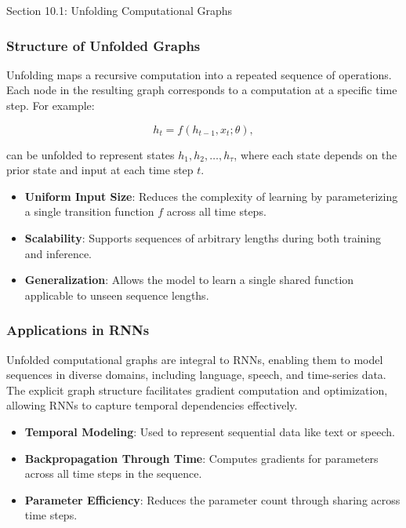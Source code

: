 \begin{notes}{Section 10.1: Unfolding Computational Graphs}
    \subsubsection*{Structure of Unfolded Graphs}
    
    Unfolding maps a recursive computation into a repeated sequence of operations. Each node in the resulting graph corresponds to a computation at a specific time step. For example:
    
    \[
    h_t = f(h_{t-1}, x_t; \theta),
    \]
    
    can be unfolded to represent states $h_1, h_2, \ldots, h_\tau$, where each state depends on the prior state and input at each time step $t$.
    
    \begin{highlight}
        \begin{itemize}
            \item \textbf{Uniform Input Size}: Reduces the complexity of learning by parameterizing a single transition function $f$ across all time steps.
            \item \textbf{Scalability}: Supports sequences of arbitrary lengths during both training and inference.
            \item \textbf{Generalization}: Allows the model to learn a single shared function applicable to unseen sequence lengths.
        \end{itemize}
    \end{highlight}
    
    \subsubsection*{Applications in RNNs}
    
    Unfolded computational graphs are integral to RNNs, enabling them to model sequences in diverse domains, including language, speech, and time-series data. The explicit graph structure facilitates 
    gradient computation and optimization, allowing RNNs to capture temporal dependencies effectively.
    
    \begin{highlight}
        \begin{itemize}
            \item \textbf{Temporal Modeling}: Used to represent sequential data like text or speech.
            \item \textbf{Backpropagation Through Time}: Computes gradients for parameters across all time steps in the sequence.
            \item \textbf{Parameter Efficiency}: Reduces the parameter count through sharing across time steps.
        \end{itemize}
    \end{highlight}
    

\end{notes}

